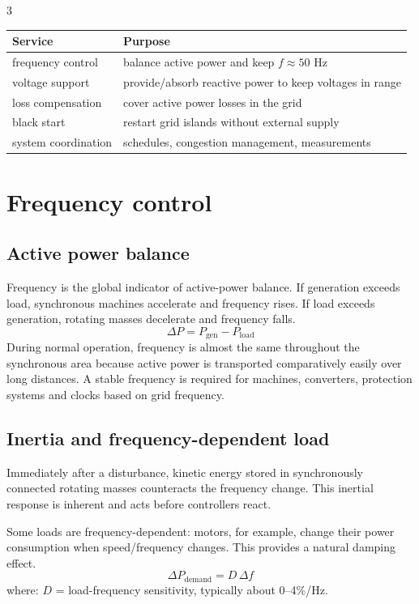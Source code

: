 \documentclass[9pt, landscape, a4paper]{article}
\begin{document}
\begin{multicols*}{3}
\begin{tabularx}{\columnwidth}{@{}lX@{}}
  \toprule
  \textbf{Service} & \textbf{Purpose}\\
  \midrule
  frequency control & balance active power and keep $f\approx50$ Hz\\
  voltage support & provide/absorb reactive power to keep voltages in range\\
  loss compensation & cover active power losses in the grid\\
  black start & restart grid islands without external supply\\
  system coordination & schedules, congestion management, measurements\\
  \bottomrule
\end{tabularx}

\section{Frequency control}
\subsection{Active power balance}
Frequency is the global indicator of active-power balance. If generation
exceeds load, synchronous machines accelerate and frequency rises. If load
exceeds generation, rotating masses decelerate and frequency falls.
\[
  \Delta P=P_{\mathrm{gen}}-P_{\mathrm{load}}
\]
During normal operation, frequency is almost the same throughout the
synchronous area because active power is transported comparatively easily over
long distances. A stable frequency is required for machines, converters,
protection systems and clocks based on grid frequency.

\subsection{Inertia and frequency-dependent load}
Immediately after a disturbance, kinetic energy stored in synchronously
connected rotating masses counteracts the frequency change. This inertial
response is inherent and acts before controllers react.

Some loads are frequency-dependent: motors, for example, change their power
consumption when speed/frequency changes. This provides a natural damping
effect.
\[
  \Delta P_{\mathrm{demand}}=D\,\Delta f
\]
where: $D$ = load-frequency sensitivity, typically about 0--4\%/Hz.


\end{multicols*}
\end{document}
